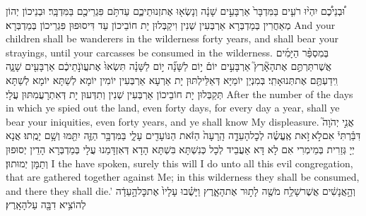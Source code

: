 {וּ֠בְנֵיכֶ֠ם יִהְי֨וּ רֹעִ֤ים בַּמִּדְבָּר֙ אַרְבָּעִ֣ים שָׁנָ֔ה וְנָשְׂא֖וּ אֶת\maqqaf זְנוּתֵיכֶ֑ם עַד\maqqaf תֹּ֥ם פִּגְרֵיכֶ֖ם בַּמִּדְבָּֽר׃}
{וּבְנֵיכוֹן יְהוֹן מְאַחֲרִין בְּמַדְבְּרָא אַרְבְּעִין שְׁנִין וִיקַבְּלוּן יָת חוֹבֵיכוֹן עַד דִּיסוּפוּן פִּגְרֵיכוֹן בְּמַדְבְּרָא׃}
{And your children shall be wanderers in the wilderness forty years, and shall bear your strayings, until your carcasses be consumed in the wilderness.}{}
{בְּמִסְפַּ֨ר הַיָּמִ֜ים אֲשֶׁר\maqqaf תַּרְתֶּ֣ם אֶת\maqqaf הָאָ֘רֶץ֮ אַרְבָּעִ֣ים יוֹם֒ י֣וֹם לַשָּׁנָ֞ה י֣וֹם לַשָּׁנָ֗ה תִּשְׂאוּ֙ אֶת\maqqaf עֲוֺנֹ֣תֵיכֶ֔ם אַרְבָּעִ֖ים שָׁנָ֑ה וִֽידַעְתֶּ֖ם אֶת\maqqaf תְּנוּאָתִֽי׃}
{בְּמִנְיַן יוֹמַיָּא דְּאַלֵּילְתּוּן יָת אַרְעָא אַרְבְּעִין יוֹמִין יוֹמָא לְשַׁתָּא יוֹמָא לְשַׁתָּא תְּקַבְּלוּן יָת חוֹבֵיכוֹן אַרְבְּעִין שְׁנִין וְתִדְּעוּן יָת דְּאִתְרָעֲמִתּוּן עֲלָי׃}
{After the number of the days in which ye spied out the land, even forty days, for every day a year, shall ye bear your iniquities, even forty years, and ye shall know My displeasure.}{}
{אֲנִ֣י יְהֹוָה֮ דִּבַּ֒רְתִּי֒ אִם\maqqaf לֹ֣א \legarmeh  זֹ֣את אֶֽעֱשֶׂ֗ה לְכׇל\maqqaf הָעֵדָ֤ה הָֽרָעָה֙ הַזֹּ֔את הַנּוֹעָדִ֖ים עָלָ֑י בַּמִּדְבָּ֥ר הַזֶּ֛ה יִתַּ֖מּוּ וְשָׁ֥ם יָמֻֽתוּ׃}
{אֲנָא יְיָ גְּזַרִית בְּמֵימְרִי אִם לָא דָּא אַעֲבֵיד לְכָל כְּנִשְׁתָּא בִּשְׁתָּא הָדָא דְּאִזְדָּמַנוּ עֲלָי בְּמַדְבְּרָא הָדֵין יְסוּפוּן וְתַמָּן יְמוּתוּן׃}
{I the \lord\space have spoken, surely this will I do unto all this evil congregation, that are gathered together against Me; in this wilderness they shall be consumed, and there they shall die.’}{}
{וְהָ֣אֲנָשִׁ֔ים אֲשֶׁר\maqqaf שָׁלַ֥ח מֹשֶׁ֖ה לָת֣וּר אֶת\maqqaf הָאָ֑רֶץ וַיָּשֻׁ֗בוּ  עָלָיו֙ אֶת\maqqaf כׇּל\maqqaf הָ֣עֵדָ֔ה לְהוֹצִ֥יא דִבָּ֖ה עַל\maqqaf הָאָֽרֶץ׃}
